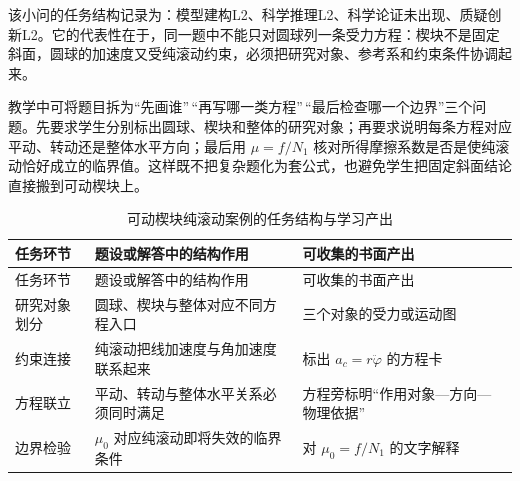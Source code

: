 \documentclass[
  12pt,
  a4paper]{ctexbook}
\begin{document}
该小问的任务结构记录为：模型建构L2、科学推理L2、科学论证未出现、质疑创新L2。它的代表性在于，同一题中不能只对圆球列一条受力方程：楔块不是固定斜面，圆球的加速度又受纯滚动约束，必须把研究对象、参考系和约束条件协调起来。

教学中可将题目拆为``先画谁''\,``再写哪一类方程''\,``最后检查哪一个边界''三个问题。先要求学生分别标出圆球、楔块和整体的研究对象；再要求说明每条方程对应平动、转动还是整体水平方向；最后用
\(\mu=f/N_1\)
核对所得摩擦系数是否是使纯滚动恰好成立的临界值。这样既不把复杂题化为套公式，也避免学生把固定斜面结论直接搬到可动楔块上。

\begin{longtable}[]{@{}
  >{\raggedright\arraybackslash}p{}
  >{\raggedright\arraybackslash}p{}
  >{\raggedright\arraybackslash}p{}@{}}
\caption{可动楔块纯滚动案例的任务结构与学习产出}\tabularnewline
\toprule\noalign{}
\rowcolor{ThesisPale}
\begin{minipage}[b]{\linewidth}\raggedright
任务环节
\end{minipage} & \begin{minipage}[b]{\linewidth}\raggedright
题设或解答中的结构作用
\end{minipage} & \begin{minipage}[b]{\linewidth}\raggedright
可收集的书面产出
\end{minipage} \\
\midrule\noalign{}
\endfirsthead
\toprule\noalign{}
\rowcolor{ThesisPale}
\begin{minipage}[b]{\linewidth}\raggedright
任务环节
\end{minipage} & \begin{minipage}[b]{\linewidth}\raggedright
题设或解答中的结构作用
\end{minipage} & \begin{minipage}[b]{\linewidth}\raggedright
可收集的书面产出
\end{minipage} \\
\midrule\noalign{}
\endhead
\bottomrule\noalign{}
\endlastfoot
研究对象划分 & 圆球、楔块与整体对应不同方程入口 &
三个对象的受力或运动图 \\
约束连接 & 纯滚动把线加速度与角加速度联系起来 & 标出
\(a_c=r\ddot\varphi\) 的方程卡 \\
方程联立 & 平动、转动与整体水平关系必须同时满足 &
方程旁标明``作用对象---方向---物理依据'' \\
边界检验 & \(\mu_0\) 对应纯滚动即将失效的临界条件 & 对 \(\mu_0=f/N_1\)
的文字解释 \\
\end{longtable}
\end{document}
